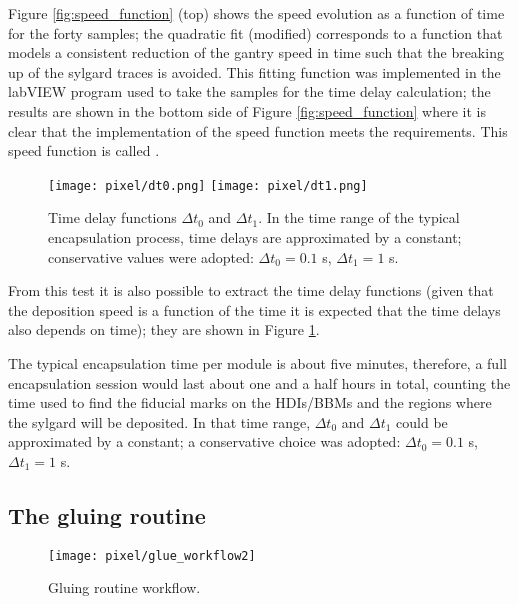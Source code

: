 Figure \ref{fig:speed_function} (top) shows the speed evolution as a function of time for the forty samples; the quadratic fit (modified) corresponds to a function that models a consistent reduction of the gantry speed in time such that the breaking up of the sylgard traces is avoided. This fitting function was implemented in the labVIEW program used to take the samples for the time delay calculation; the results are shown in the bottom side of Figure \ref{fig:speed_function} where it is clear that the implementation of the speed function meets the requirements. This speed function is called .

\begin{figure}[h]
  \begin{center}
    \texttt{[image: pixel/dt0.png]} 
    \texttt{[image: pixel/dt1.png]}
    \caption[Time delay functions.]{Time delay functions $\Delta t_0$ and $\Delta t_1$. In the time range of the typical encapsulation process, time delays are approximated by a constant; conservative values were adopted:  $\Delta t_0 =0.1$ s,  $\Delta t_1 = 1$ s.}\label{fig:time_delay_functions}
  \end{center}
\end{figure}

From this test it is also possible to extract the time delay functions (given that the deposition speed is a function of the time it is expected that the time delays also depends on time); they are shown in Figure \ref{fig:time_delay_functions}.

The typical encapsulation time per module is about five minutes, therefore, a full encapsulation session would last about one and a half hours in total, counting the time used to find the fiducial marks on the HDIs/BBMs and the regions where the sylgard will be deposited. In that time range, $\Delta t_0$ and $\Delta t_1$ could be approximated by a constant; a conservative choice was adopted: $\Delta t_0 =0.1$ s,  $\Delta t_1 = 1$ s.            

\subsection{The gluing routine}

\begin{figure}[h]
  \begin{center}
    \texttt{[image: pixel/glue\_workflow2]}
    \caption[Gluing routine workflow.]{Gluing routine workflow.}\label{fig:glue_workflow}
  \end{center}
\end{figure}

